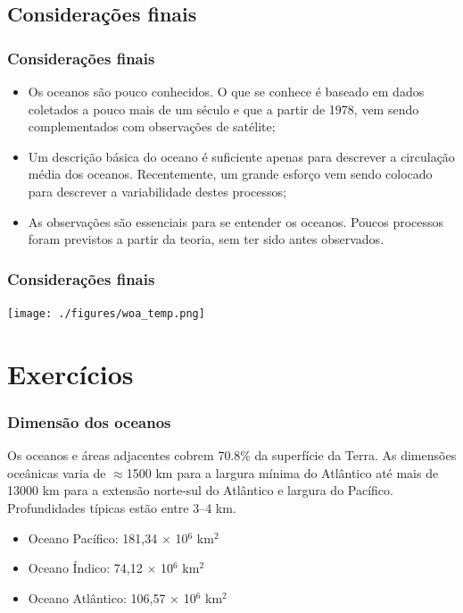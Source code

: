 \documentclass[14pt,xcolor=dvipsnames]{beamer}
\begin{document}
\subsection{Considerações finais}
\begin{frame}
    \frametitle{Considerações finais}
\small{
    \begin{itemize}[<+-| alert@+>]
        \item Os oceanos são pouco conhecidos.  O que se conhece é baseado em
              dados coletados a pouco mais de um século e que a partir de 1978,
              vem sendo complementados com observações de satélite;
        \item Um descrição básica do oceano é suficiente apenas para descrever
              a circulação média dos oceanos.  Recentemente, um grande esforço
              vem sendo colocado para descrever a variabilidade destes processos;
        \item As observações são essenciais para se entender os oceanos.
              Poucos processos foram previstos a partir da teoria, sem ter sido antes observados.
    \end{itemize}
}
\end{frame}

\begin{frame}
    \frametitle{Considerações finais}
    \centerline{\texttt{[image: ./figures/woa\_temp.png]}}
\end{frame}

\section{Exercícios}
\begin{frame}
    \frametitle{Dimensão dos oceanos}

    \small{Os oceanos e áreas adjacentes cobrem 70.8\% da superfície da Terra.
    As dimensões oceânicas varia de $\approx$1500 km para a largura mínima do
    Atlântico até mais de 13000 km para a extensão norte-sul do Atlântico e
    largura do Pacífico.  Profundidades típicas estão entre 3--4 km.}

    \begin{itemize}[<+-| alert@+>]
        \item Oceano Pacífico: 181,34 $\times$ 10$^6$ km$^2$
        \item Oceano Índico: 74,12 $\times$ 10$^6$ km$^2$
        \item Oceano Atlântico: 106,57 $\times$ 10$^6$ km$^2$
    \end{itemize}
\end{frame}
\end{document}
